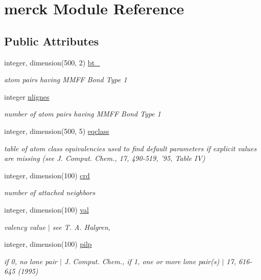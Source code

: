 \hypertarget{classmerck}{\section{merck Module Reference}
\label{classmerck}
}
\subsection*{Public Attributes}
\begin{DoxyCompactItemize}
\item 
integer, dimension(500, 2) \hyperlink{classmerck_a7aa21a7d8bb06595bc78236550c401c8}{bt\-\_}
\begin{DoxyCompactList}\small\item\em atom pairs having M\-M\-F\-F Bond Type 1 \end{DoxyCompactList}\item 
integer \hyperlink{classmerck_acec340287dd736c720d96b5328c4d2c9}{nlignes}
\begin{DoxyCompactList}\small\item\em number of atom pairs having M\-M\-F\-F Bond Type 1 \end{DoxyCompactList}\item 
integer, dimension(500, 5) \hyperlink{classmerck_a8eadf59b7bbaa44a94d888299dcb8e35}{eqclass}
\begin{DoxyCompactList}\small\item\em table of atom class equivalencies used to find default parameters if explicit values are missing (see J. Comput. Chem., 17, 490-\/519, '95, Table I\-V) \end{DoxyCompactList}\item 
integer, dimension(100) \hyperlink{classmerck_ad5b47a826f521beb8f04587afe2368da}{crd}
\begin{DoxyCompactList}\small\item\em number of attached neighbors \end{DoxyCompactList}\item 
integer, dimension(100) \hyperlink{classmerck_a0bc0ef340bd3d358ede6d66a415952a3}{val}
\begin{DoxyCompactList}\small\item\em valency value $|$ see T. A. Halgren, \end{DoxyCompactList}\item 
integer, dimension(100) \hyperlink{classmerck_ac3a6272c62f8f3e04549ad11b9ee9033}{pilp}
\begin{DoxyCompactList}\small\item\em if 0, no lone pair $|$ J. Comput. Chem., if 1, one or more lone pair(s) $|$ 17, 616-\/645 (1995) \end{DoxyCompactList}\item 

\end{DoxyCompactItemize}
